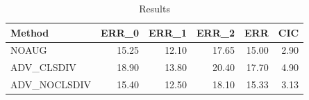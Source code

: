 \begin{table}
\caption{Results}
\label{tab:Results}
\begin{tabular}{lrrrrr}
\toprule
Method & ERR\_0 & ERR\_1 & ERR\_2 & ERR & CIC \\
\midrule
NOAUG & 15.25 & 12.10 & 17.65 & 15.00 & 2.90 \\
ADV\_CLSDIV & 18.90 & 13.80 & 20.40 & 17.70 & 4.90 \\
ADV\_NOCLSDIV & 15.40 & 12.50 & 18.10 & 15.33 & 3.13 \\
\bottomrule
\end{tabular}
\end{table}
